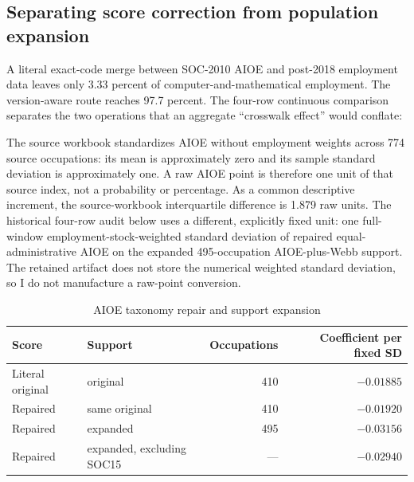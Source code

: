 \subsection{Separating score correction from population expansion}

A literal exact-code merge between SOC-2010 AIOE and post-2018 employment data leaves only 3.33 percent of computer-and-mathematical employment.  The version-aware route reaches 97.7 percent.  The four-row continuous comparison separates the two operations that an aggregate ``crosswalk effect'' would conflate:

The source workbook standardizes AIOE without employment weights across 774 source occupations: its mean is approximately zero and its sample standard deviation is approximately one.  A raw AIOE point is therefore one unit of that source index, not a probability or percentage.  As a common descriptive increment, the source-workbook interquartile difference is 1.879 raw units.  The historical four-row audit below uses a different, explicitly fixed unit: one full-window employment-stock-weighted standard deviation of repaired equal-administrative AIOE on the expanded 495-occupation AIOE-plus-Webb support.  The retained artifact does not store the numerical weighted standard deviation, so I do not manufacture a raw-point conversion.

\begin{table}[!htbp]
\centering
\caption{AIOE taxonomy repair and support expansion}\label{tab:app_crosswalk}
\begin{tabular}{llrr}
\toprule
Score & Support & Occupations & Coefficient per fixed SD \\
\midrule
Literal original & original & 410 & $-0.01885$ \\
Repaired & same original & 410 & $-0.01920$ \\
Repaired & expanded & 495 & $-0.03156$ \\
Repaired & expanded, excluding SOC15 & --- & $-0.02940$ \\
\bottomrule
\end{tabular}
\end{table}

